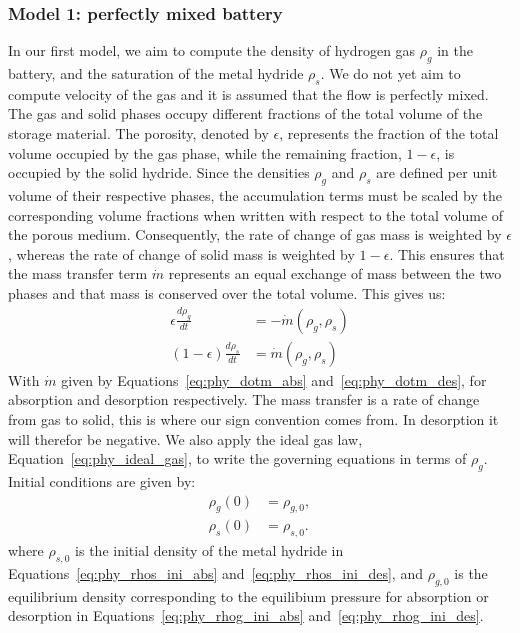 \subsubsection*{Model 1: perfectly mixed battery}
In our first model, we aim to compute the density of hydrogen gas $\rho_g$ in the battery, and the saturation of the metal hydride $\rho_s$. We do not yet aim to compute velocity of the gas and it is assumed that the flow is perfectly mixed. The gas and solid phases occupy different fractions of the total volume of the storage material. The porosity, denoted by $\epsilon$, represents the fraction of the total volume occupied by the gas phase, while the remaining fraction, $1-\epsilon$, is occupied by the solid hydride. Since the densities $\rho_g$ and $\rho_s$ are defined per unit volume of their respective phases, the accumulation terms must be scaled by the corresponding volume fractions when written with respect to the total volume of the porous medium. Consequently, the rate of change of gas mass is weighted by $\epsilon$, whereas the rate of change of solid mass is weighted by $1-\epsilon$. This ensures that the mass transfer term $\dot{m}$ represents an equal exchange of mass between the two phases and that mass is conserved over the total volume. This gives us:
\begin{subequations}\label{eq:model_1_gov}
    \begin{align}
        \epsilon\frac{d\rho_g}{dt} &= -\dot{m}(\rho_g, \rho_s) \\
        (1-\epsilon)\frac{d\rho_s}{dt} &= \dot{m}(\rho_g, \rho_s)
    \end{align}
\end{subequations}
With $\dot{m}$ given by Equations~\ref{eq:phy_dotm_abs} and~\ref{eq:phy_dotm_des}, for absorption and desorption respectively. The mass transfer is a rate of change from gas to solid, this is where our sign convention comes from. In desorption it will therefor be negative. We also apply the ideal gas law, Equation~\ref{eq:phy_ideal_gas}, to write the governing equations in terms of $\rho_g$. Initial conditions are given by:
\begin{subequations}
\begin{align}
    \rho_g(0) &= \rho_{g,0}, \\
    \rho_s(0) &= \rho_{s,0}.
\end{align}
\end{subequations}
where $\rho_{s,0}$ is the initial density of the metal hydride in Equations~\ref{eq:phy_rhos_ini_abs} and~\ref{eq:phy_rhos_ini_des}, and $\rho_{g,0}$ is the equilibrium density corresponding to the equilibium pressure for absorption or desorption in Equations~\ref{eq:phy_rhog_ini_abs} and~\ref{eq:phy_rhog_ini_des}.


